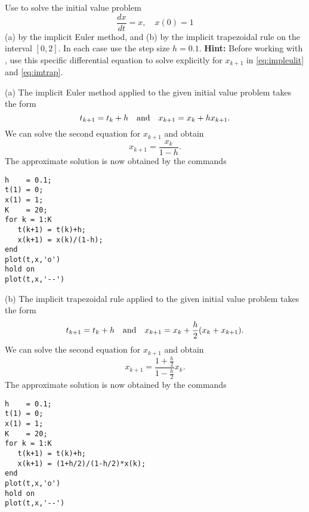 \documentclass{ximera}
\begin{document}
\begin{computerExercise} \label{c15.1.7}
Use \Matlab to solve the initial value problem
\[
\frac{dx}{dt} = x,\quad x(0)=1
\]
(a) by the implicit Euler method, and (b) by the implicit trapezoidal 
rule on the interval $[0,2]$.  In each case use the step size $h=0.1$.
{\bf Hint:} Before working with \Matlabp, use this specific differential
equation to solve explicitly for $x_{k+1}$ in \eqref{eq:impleulit} and 
\eqref{eq:imtrap}.

\begin{solution}

(a) The implicit Euler method applied to the given initial
value problem takes the form
\[
t_{k+1} = t_k + h\quad\mbox{and}\quad x_{k+1} = x_k + h x_{k+1}.
\]
We can solve the second equation  for $x_{k+1}$ and obtain
\[
x_{k+1} = \frac{x_k}{1-h}.
\]
The approximate solution is now obtained by the \Matlab commands
\begin{verbatim}
h    = 0.1;
t(1) = 0;
x(1) = 1;
K    = 20;
for k = 1:K
   t(k+1) = t(k)+h;
   x(k+1) = x(k)/(1-h);
end
plot(t,x,'o')
hold on
plot(t,x,'--')
\end{verbatim}

(b) The implicit trapezoidal rule applied to the given initial
value problem takes the form
\[
t_{k+1} = t_k + h\quad\mbox{and}\quad x_{k+1} = x_k + \frac{h}{2}(x_k+x_{k+1}).
\]
We can solve the second equation for $x_{k+1}$ and obtain
\[
x_{k+1} = \frac{1+\frac{h}{2}}{1-\frac{h}{2}}x_k.
\]
The approximate solution is now obtained by the \Matlab commands
\begin{verbatim}
h    = 0.1;
t(1) = 0;
x(1) = 1;
K    = 20;
for k = 1:K
   t(k+1) = t(k)+h;
   x(k+1) = (1+h/2)/(1-h/2)*x(k);
end
plot(t,x,'o')
hold on
plot(t,x,'--')
\end{verbatim}

\end{solution}
\end{computerExercise}
\end{document}
